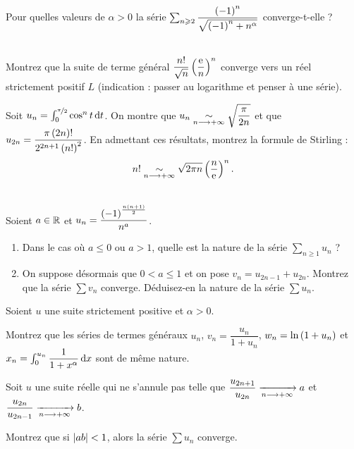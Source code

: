 \begin{exoss}[Exercice 11]
Pour quelles valeurs de \(\alpha>0\) la série \(\sum_{n\geqslant2}\dfrac{\left(-1\right)^n}{\sqrt{\left(-1\right)^n+n^\alpha}}\) converge-t-elle ?
\end{exoss}



\begin{exoss}~\\
Montrez que la suite de terme général \(\dfrac{n!}{\sqrt{n}}\left(\dfrac{\mathrm{e}^{}}{n}\right)^n\) converge vers un réel strictement positif \(L\) (indication : passer au logarithme et penser à une série).

Soit \(u_n=\int_0^{\nicefrac{\pi}{2}}\cos^nt\odif{t}\). On montre que \(u_n\underset{n\longrightarrow+\infty}{\sim}\sqrt{\dfrac{\pi}{2n}}\) et que \(u_{2n}=\dfrac{\pi\left(2n\right)!}{2^{2n+1}\left(n!\right)^2}\). En admettant ces résultats, montrez la formule de Stirling : \[n!\underset{n\longrightarrow+\infty}{\sim}\sqrt{2\pi n}\left(\dfrac{n}{\mathrm{e}^{}}\right)^n.\]
\end{exoss}



\begin{exoss}[Exercice 13]~\\
Soient \(a\in\mathbb{R}\) et \(u_n=\dfrac{\left(-1\right)^{\frac{n\left(n+1\right)}{2}}}{n^a}\).

\begin{enumerate}
    \item Dans le cas où \(a\leq0\) ou \(a>1\), quelle est la nature de la série \(\sum_{n\geq1}u_n\) ? \\
    \item On suppose désormais que \(0<a\leq1\) et on pose \(v_n=u_{2n-1}+u_{2n}\). Montrez que la série \(\sum v_n\) converge. Déduisez-en la nature de la série \(\sum u_n\).
\end{enumerate}
\end{exoss}



\begin{exoss}[Exercice 14]
Soient \(u\) une suite strictement positive et \(\alpha>0\).

Montrez que les séries de termes généraux \(u_n\), \(v_n=\dfrac{u_n}{1+u_n}\), \(w_n=\ln\left(1+u_n\right)\) et \(x_n=\int_0^{u_n}\dfrac{1}{1+x^\alpha}\odif{x}\) sont de même nature.
\end{exoss}



\begin{exoss}[Exercice 15]
Soit \(u\) une suite réelle qui ne s'annule pas telle que \(\dfrac{u_{2n+1}}{u_{2n}}\xrightarrow[n\longrightarrow+\infty]{}a\) et \(\dfrac{u_{2n}}{u_{2n-1}}\xrightarrow[n\longrightarrow+\infty]{}b\).

Montrez que si \(\left\lvert ab\right\rvert<1\), alors la série \(\sum u_n\) converge.
\end{exoss}



